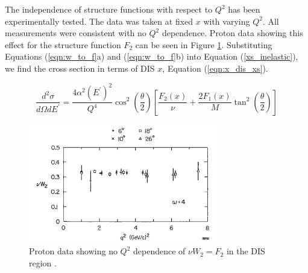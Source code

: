 The independence of structure functions with respect to $Q^2$ has been experimentally tested. The data was taken at fixed $x$ with varying $Q^2$. All measurements were consistent with no $Q^2$ dependence. Proton data showing this effect for the structure function $F_2$ can be seen in Figure \ref{fig:noQ2F2}. Substituting Equations (\ref{eqn:w_to_f}a) and (\ref{eqn:w_to_f}b) into Equation (\ref{xs_inelastic}), we find the cross section in terms of DIS $x$, Equation (\ref{eqn:x_dis_xs}).

\begin{equation}
	\frac{d^2\sigma}{d\Omega dE^\prime} = \frac{4\alpha^2\left(E^\prime\right)^2}{Q^4}\cos^2\left(\frac{\theta}{2}\right) \left[\frac{F_2\left(x\right)}{\nu} + \frac{2F_1\left(x\right)}{M}\tan^2\left(\frac{\theta}{2}\right)\right]
	\label{eqn:x_dis_xs}
\end{equation}

\begin{figure}
\begin{center}
	\includegraphics[width=0.75\textwidth]{./scattering/fig/no_q2_dep.png}
	\caption{Proton data showing no $Q^2$ dependence of $\nu W_2=F_2$ in the DIS region \cite{FriedmanKendall}.}
	\label{fig:noQ2F2}
\end{center}
\end{figure}